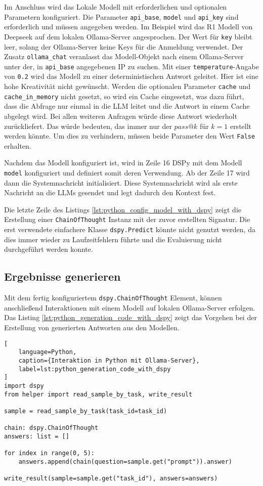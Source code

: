 Im Anschluss wird das Lokale Modell mit erforderlichen und optionalen Parametern konfiguriert. Die Parameter \texttt{api\_base}, \texttt{model} und \texttt{api\_key} sind erforderlich und müssen angegeben werden. Im Beispiel wird das R1 Modell von Deepseek auf dem lokalen Ollama-Server angesprochen. Der Wert für \texttt{key} bleibt leer, solang der Ollama-Server keine Keys für die Anmeldung verwendet. Der Zusatz \texttt{ollama\_chat} veranlasst das Modell-Objekt nach einem Ollama-Server unter der, in \texttt{api\_base} angegebenen IP zu suchen. Mit einer \texttt{temperature}-Angabe von \texttt{0.2} wird das Modell zu einer deterministischen Antwort geleitet. Hier ist eine hohe Kreativität nicht gewünscht. Werden die optionalen Parameter \texttt{cache} und \texttt{cache\_in\_memory} nicht gesetzt, so wird ein Cache eingesetzt, was dazu führt, dass die Abfrage nur einmal in die LLM leitet und die Antwort in einem Cache abgelegt wird. Bei allen weiteren Anfragen würde diese Antwort wiederholt zurückliefert. Das würde bedeuten, das immer nur der $pass@k$ für $k=1$ erstellt werden könnte. Um dies zu verhindern, müssen beide Parameter den Wert \texttt{False} erhalten.\vspace{0.2cm}

Nachdem das Modell konfiguriert ist, wird in Zeile 16 DSPy mit dem Modell \texttt{model} konfiguriert und definiert somit deren Verwendung. Ab der Zeile 17 wird dann die Systemnachricht initialisiert. Diese Systemnachricht wird als erste Nachricht an die LLMs gesendet und legt dadurch den Kontext fest.\vspace{0.2cm}

Die letzte Zeile des Listings \ref{lst:python_config_model_with_dspy} zeigt die Erstellung einer \texttt{ChainOfThought} Instanz mit der zuvor erstellten Signatur. Die erst verwendete einfachere Klasse \texttt{dspy.Predict} könnte nicht genutzt werden, da dies immer wieder zu Laufzeitfehlern führte und die Evaluierung nicht durchgeführt werden konnte.


\subsection{Ergebnisse generieren}
Mit dem fertig konfiguriertem \texttt{dspy.ChainOfThought} Element, können anschließend Interaktionen mit einem Modell auf lokalen Ollama-Server erfolgen. Das Listing \ref{lst:python_generation_code_with_dspy} zeigt das Vorgehen bei der Erstellung von generierten Antworten aus den Modellen.

\begin{lstlisting}[
	language=Python,
	caption={Interaktion in Python mit Ollama-Server},
	label=lst:python_generation_code_with_dspy
]
import dspy
from helper import read_sample_by_task, write_result

sample = read_sample_by_task(task_id=task_id)

chain: dspy.ChainOfThought
answers: list = []

for index in range(0, 5):
    answers.append(chain(question=sample.get("prompt")).answer)

write_result(sample=sample.get("task_id"), answers=answers)
\end{lstlisting}

